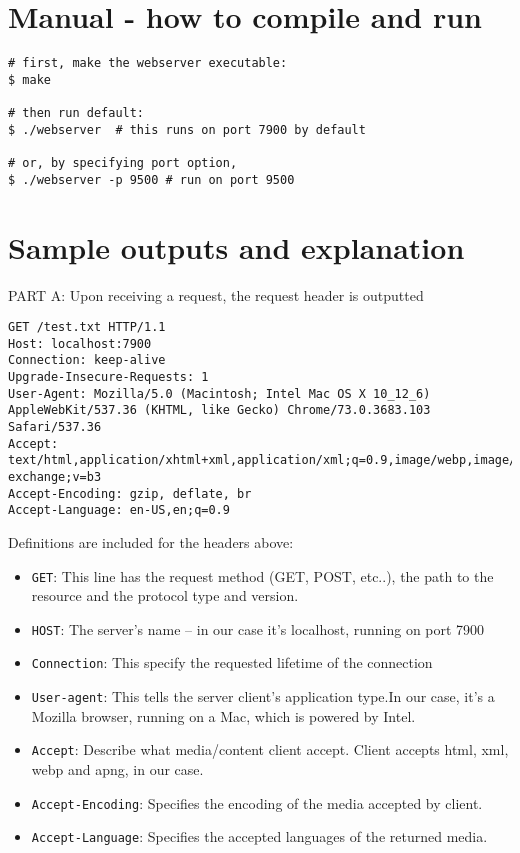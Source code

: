 \documentclass[11pt]{article}
\begin{document}
\section{Manual - how to compile and run}
\begin{verbatim} 
# first, make the webserver executable:
$ make

# then run default:
$ ./webserver  # this runs on port 7900 by default

# or, by specifying port option,
$ ./webserver -p 9500 # run on port 9500
\end{verbatim}

\section{Sample outputs and explanation}

PART A:
Upon receiving a request, the request header is outputted
\begin{verbatim}
GET /test.txt HTTP/1.1
Host: localhost:7900
Connection: keep-alive
Upgrade-Insecure-Requests: 1
User-Agent: Mozilla/5.0 (Macintosh; Intel Mac OS X 10_12_6) AppleWebKit/537.36 (KHTML, like Gecko) Chrome/73.0.3683.103 Safari/537.36
Accept: text/html,application/xhtml+xml,application/xml;q=0.9,image/webp,image/apng,*/*;q=0.8,application/signed-exchange;v=b3
Accept-Encoding: gzip, deflate, br
Accept-Language: en-US,en;q=0.9
\end{verbatim}
Definitions are included for the headers above:
\begin{itemize}
  \item \texttt{GET}: This line has the request method (GET, POST, etc..), the path to the resource and the protocol type and version.
  \item \texttt{HOST}: The server's name -- in our case it's localhost, running on port 7900
  \item \texttt{Connection}: This specify the requested lifetime of the connection
  \item \texttt{User-agent}: This tells the server client's application type.In our case, it's a Mozilla browser, running on a Mac, which is powered by Intel.
  \item \texttt{Accept}: Describe what media/content client accept. Client accepts html, xml, webp and apng, in our case.
  \item \texttt{Accept-Encoding}: Specifies the encoding of the media accepted by client.
  \item\texttt{Accept-Language}: Specifies the accepted languages of the returned media.
\end{itemize}
\end{document}
